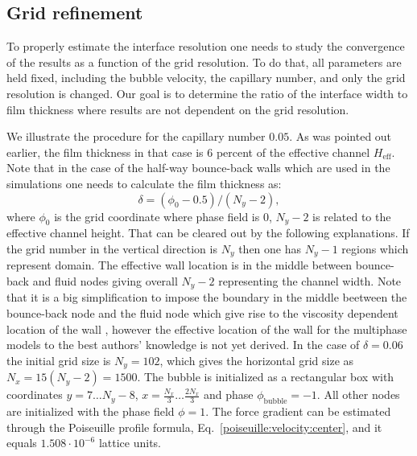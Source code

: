 \documentclass{article}
\begin{document}
\subsection{Grid refinement}
To properly estimate the interface resolution one needs to study the convergence
of the results as a function of the grid resolution. To do that, all parameters are held fixed,
including the bubble velocity, the capillary number, and only the grid
resolution is changed. Our goal is to determine the ratio of the interface width to 
film thickness where results are not dependent on the grid resolution.

We illustrate the procedure for the capillary number
$0.05$. As was pointed out earlier, the film thickness in that case is $6$ percent of the effective
channel $H_{\mathrm{eff}}$.
Note that in the case of the half-way bounce-back walls \cite{yu} which are used in the
simulations one needs to calculate the film thickness as:
\begin{equation}
\delta=(\phi_0-0.5)/(N_y-2),
\end{equation}
where $\phi_0$ is the grid coordinate where phase field is $0$, $N_y-2$
is related to the effective channel height. That can be cleared out by the following explanations.
If the grid number in the vertical direction is $N_y$ then one has $N_y-1$ regions which represent
domain. The effective wall location is in the middle between bounce-back and fluid nodes giving
overall $N_y-2$ representing the channel width. Note that it is a big
simplification to impose the boundary in the middle beetween the bounce-back
node and the fluid node which give rise to the viscosity dependent location of
the wall \cite{ginzburg-multireflection}, however the effective location of the wall for the
multiphase models to the best authors' knowledge is not yet derived. In the case of $\delta=0.06$
the
initial grid size is $N_y=102$, which gives the horizontal grid size as $N_x=15(N_y-2)=1500$.
The bubble is initialized as a rectangular box with coordinates
$y=7\dots N_y-8$, $x=\frac{N_x}{3}\dots \frac{2 N_x}{3}$ and phase
$\phi_{\mathrm{bubble}}=-1$. All other nodes are initialized with the phase field
$\phi=1$. The force gradient can be estimated through the Poiseuille
profile formula, Eq.~\ref{poiseuille:velocity:center}, and it equals
$1.508 \cdot 10^{-6}$ lattice units.
\end{document}
